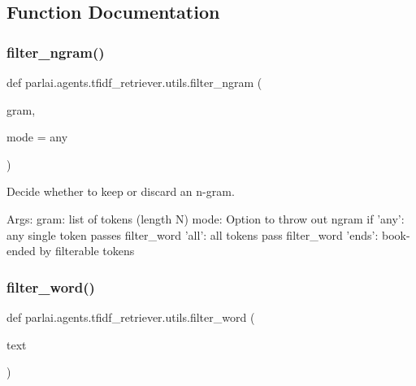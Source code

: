 \subsection{Function Documentation}
\mbox{\label{namespaceparlai_1_1agents_1_1tfidf__retriever_1_1utils_a791c829884544e127e480a52d233d521}} 
\subsubsection{\texorpdfstring{filter\+\_\+ngram()}{filter\_ngram()}}
{\footnotesize\ttfamily def parlai.\+agents.\+tfidf\+\_\+retriever.\+utils.\+filter\+\_\+ngram (\begin{DoxyParamCaption}\item[{}]{gram,  }\item[{}]{mode = {\ttfamily \textquotesingle{}any\textquotesingle{}} }\end{DoxyParamCaption})}

\begin{DoxyVerb}Decide whether to keep or discard an n-gram.

Args:
    gram: list of tokens (length N)
    mode: Option to throw out ngram if
      'any': any single token passes filter_word
      'all': all tokens pass filter_word
      'ends': book-ended by filterable tokens
\end{DoxyVerb}
 \mbox{\label{namespaceparlai_1_1agents_1_1tfidf__retriever_1_1utils_a57608b2b9a61223e39e3cb51f5c9f812}} 
\subsubsection{\texorpdfstring{filter\+\_\+word()}{filter\_word()}}
{\footnotesize\ttfamily def parlai.\+agents.\+tfidf\+\_\+retriever.\+utils.\+filter\+\_\+word (\begin{DoxyParamCaption}\item[{}]{text }\end{DoxyParamCaption})}

